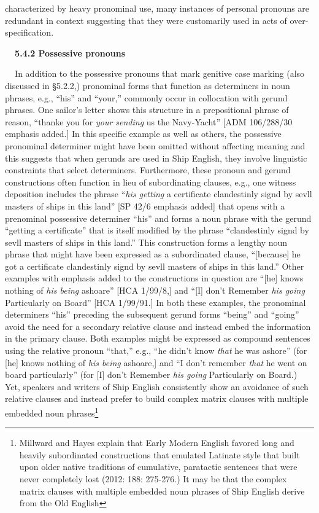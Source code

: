 \documentclass[12pt]{article}
\newenvironment{styleStandard}{\renewcommand\baselinestretch{1.0}\setlength\leftskip{0cm}\setlength\rightskip{0cm plus 1fil}\setlength\parindent{0cm}\setlength\parfillskip{0pt plus 1fil}\setlength\parskip{0in plus 1pt}\writerlistparindent\writerlistleftskip\leavevmode\normalfont\normalsize\writerlistlabel\ignorespaces}{\unskip\vspace{0in plus 1pt}\par}
\newcommand\writerlistleftskip{}
\newcommand\writerlistparindent{}
\newcommand\writerlistlabel{}
\begin{document}
\begin{styleStandard}
characterized by heavy pronominal use, many instances of personal pronouns are redundant in context suggesting that they were customarily used in acts of over-specification. \ 
\end{styleStandard}


\begin{styleStandard}
\textbf{\ \ 5.4.2 Possessive pronouns}
\end{styleStandard}


\begin{styleStandard}
\textbf{\ \ }In addition to the possessive pronouns that mark genitive case marking (also discussed in §5.2.2,) pronominal forms that function as determiners in noun phrases, e.g., “his” and “your,” commonly occur in collocation with gerund phrases. One sailor’s letter shows this structure in a prepositional phrase of reason, “thanke you for \textit{your sending} us the Navy-Yacht” [ADM 106/288/30 emphasis added.] In this specific example as well as others, the possessive pronominal determiner might have been omitted without affecting meaning and this suggests that when gerunds are used in Ship English, they involve linguistic constraints that select determiners. Furthermore, these pronoun and gerund constructions often function in lieu of subordinating clauses, e.g., one witness deposition includes the phrase “\textit{his getting} a certificate clandestinly sign{\textquotesingle}d by sevll masters of ships in this land” [SP 42/6 emphasis added] that opens with a prenominal possessive determiner “his” and forms a noun phrase with the gerund “getting a certificate” that is itself modified by the phrase “clandestinly sign{\textquotesingle}d by sevll masters of ships in this land.” This construction forms a lengthy noun phrase that might have been expressed as a subordinated clause, “[because] he got a certificate clandestinly sign{\textquotesingle}d by sevll masters of ships in this land.” Other examples with emphasis added to the constructions in question are “[he] knows nothing of \textit{his being} ashoare” [HCA 1/99/8,] and “[I] don’t Remember \textit{his going }Particularly on Board” [HCA 1/99/91.] In both these examples, the pronominal determiners “his” preceding the subsequent gerund forms “being” and “going” avoid the need for a secondary relative clause and instead embed the information in the primary clause. Both examples might be expressed as compound sentences using the relative pronoun “that,” e.g., “he didn’t know\textit{ that} he was ashore” (for [he] knows nothing of \textit{his being }ashoare,] and “I don’t remember \textit{that} he went on board particularly” (for [I] don’t Remember \textit{his going }Particularly on Board.) Yet, speakers and writers of Ship English consistently show an avoidance of such relative clauses and instead prefer to build complex matrix clauses with multiple embedded noun phrases\footnote{ Millward and Hayes explain that Early Modern English favored long and heavily subordinated constructions that emulated Latinate style that built upon older native traditions of cumulative, paratactic sentences that were never completely lost (2012: 188: 275-276.) It may be that the complex matrix clauses with multiple embedded noun phrases of Ship English derive from the Old English 
\end{styleStandard}
\end{document}
